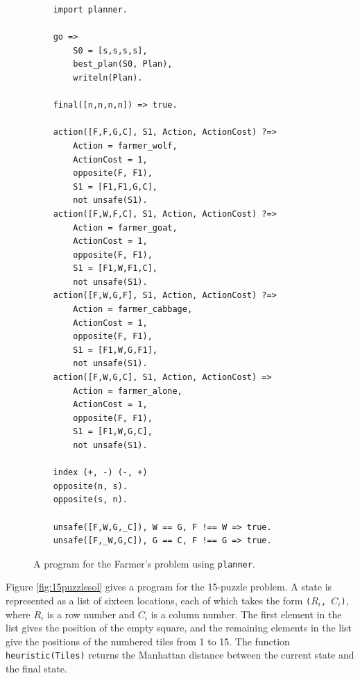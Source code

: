 \begin{figure}
\begin{center}
\begin{verbatim}
    import planner.

    go =>
        S0 = [s,s,s,s],
        best_plan(S0, Plan),
        writeln(Plan).

    final([n,n,n,n]) => true.

    action([F,F,G,C], S1, Action, ActionCost) ?=>
        Action = farmer_wolf,
        ActionCost = 1,        
        opposite(F, F1),
        S1 = [F1,F1,G,C],
        not unsafe(S1).
    action([F,W,F,C], S1, Action, ActionCost) ?=>
        Action = farmer_goat,
        ActionCost = 1,        
        opposite(F, F1),
        S1 = [F1,W,F1,C],
        not unsafe(S1).
    action([F,W,G,F], S1, Action, ActionCost) ?=>
        Action = farmer_cabbage,
        ActionCost = 1,        
        opposite(F, F1),
        S1 = [F1,W,G,F1],
        not unsafe(S1).
    action([F,W,G,C], S1, Action, ActionCost) =>
        Action = farmer_alone,
        ActionCost = 1,        
        opposite(F, F1),
        S1 = [F1,W,G,C],
        not unsafe(S1).

    index (+, -) (-, +)
    opposite(n, s).
    opposite(s, n).

    unsafe([F,W,G,_C]), W == G, F !== W => true.
    unsafe([F,_W,G,C]), G == C, F !== G => true.
\end{verbatim}
\end{center}
\caption{\label{fig:farmer2}A program for the Farmer's problem using \texttt{planner}.}
\end{figure}

Figure \ref{fig:15puzzlesol} gives a program for the 15-puzzle problem. A state is represented as a list of sixteen locations, each of which takes the form \texttt{($R_i$, $C_i$)}, where $R_i$ is a row number and $C_i$ is a column number. The first element in the list gives the position of the empty square, and the remaining elements in the list give the positions of the numbered tiles from 1 to 15. The function \texttt{heuristic(Tiles)} returns the Manhattan distance between the current state and the final state.

